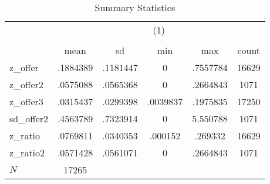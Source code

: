 \begin{table}[htbp]\centering
\def\sym#1{\ifmmode^{#1}\else\(^{#1}\)\fi}
\caption{Summary Statistics}
\begin{tabular}{l*{1}{ccccc}}
\hline\hline
            &\multicolumn{5}{c}{(1)}                                         \\
            &\multicolumn{5}{c}{}                                            \\
            &        mean&          sd&         min&         max&       count\\
\hline
z\_offer     &    .1884389&    .1181447&           0&    .7557784&       16629\\
z\_offer2    &    .0575088&    .0565368&           0&    .2664843&        1071\\
z\_offer3    &    .0315437&    .0299398&    .0039837&    .1975835&       17250\\
sd\_offer2   &    .4563789&    .7323914&           0&    5.550788&        1071\\
z\_ratio     &    .0769811&    .0340353&     .000152&     .269332&       16629\\
z\_ratio2    &    .0571428&    .0561071&           0&    .2664843&        1071\\
\hline
\(N\)       &       17265&            &            &            &            \\
\hline\hline
\end{tabular}
\end{table}
